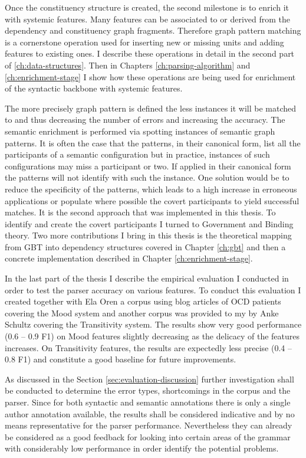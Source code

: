 Once the constituency structure is created, the second milestone is to enrich it with systemic features. Many features can be associated to or derived from the dependency and constituency graph fragments. Therefore graph pattern matching is a cornerstone operation used for inserting new or missing units and adding features to existing ones. I describe these operations in detail in the second part of \ref{ch:data-structures}. Then in Chapters \ref{ch:parsing-algorithm} and \ref{ch:enrichment-stage} I show how these operations are being used for enrichment of the syntactic backbone with systemic features.

The more precisely graph pattern is defined the less instances it will be matched to and thus decreasing the number of errors and increasing the accuracy. The semantic enrichment is performed via spotting instances of semantic graph patterns. It is often the case that the patterns, in their canonical form, list all the participants of a semantic configuration but in practice, instances of such configurations may miss a participant or two. If applied in their canonical form the patterns will not identify with such the instance. One solution would be to reduce the specificity of the patterns, which leads to a high increase in erroneous applications or populate where possible the covert participants to yield successful matches. It is the second approach that was implemented in this thesis. To identify and create the covert participants I turned to Government and Binding theory. Two more contributions I bring in this thesis is the theoretical mapping from GBT into dependency structures covered in Chapter \ref{ch:gbt} and then a concrete implementation described in Chapter \ref{ch:enrichment-stage}.

In the last part of the thesis I describe the empirical evaluation I conducted in order to test the parser accuracy on various features. To conduct this evaluation I created together with Ela Oren a corpus using blog articles of OCD patients covering the Mood system and another corpus was provided to my by Anke Schultz covering the Transitivity system. The results show very good performance (0.6 -- 0.9 F1) on Mood features slightly decreasing as the delicacy of the features increases. On Transitivity features, the results are expectedly less precise (0.4 -- 0.8 F1) and constitute a good baseline for future improvements. 

As discussed in the Section \ref{sec:evaluation-discussion} further investigation shall be conducted to determine the error types, shortcomings in the corpus and the parser. Since for both syntactic and semantic annotations there is only a single author annotation available, the results shall be considered indicative and by no means representative for the parser performance. Nevertheless they can already be considered as a good feedback for looking into certain areas of the grammar with considerably low performance in order identify the potential problems.

